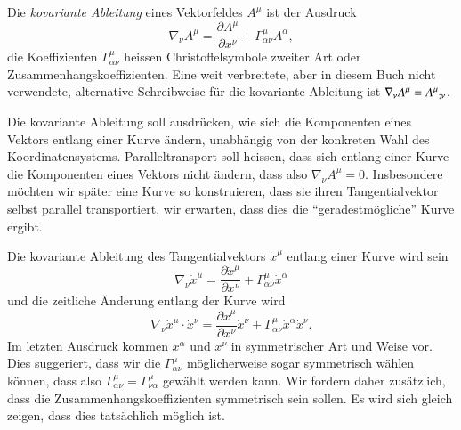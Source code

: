 \begin{definition}
Die {\em kovariante Ableitung} eines Vektorfeldes $A^\mu$ ist der 
%
%
Ausdruck
\begin{equation}
\nabla_\nu A^\mu
=
\frac{\partial A^\mu}{\partial x^\nu}
+
\Gamma^\mu_{\alpha\nu}A^\alpha,
\label{skript:geodaeten:kovarianteableitung}
\end{equation}
die Koeffizienten $\Gamma^\mu_{\alpha\nu}$ heissen Christoffelsymbole
zweiter Art oder Zusammenhangskoeffizienten.
Eine weit verbreitete, aber in diesem Buch nicht verwendete,
alternative Schreibweise für die kovariante Ableitung ist
$
\nabla_\nu A^\mu
=
A^\mu\mathstrut_{;\nu}
$.
\end{definition}

Die kovariante Ableitung soll ausdrücken, wie sich die Komponenten eines
Vektors entlang einer Kurve ändern, unabhängig von der konkreten Wahl
des Koordinatensystems.
Paralleltransport soll heissen, dass sich entlang einer Kurve die
Komponenten eines Vektors nicht ändern,
dass also $\nabla_\nu A^\mu=0$.
Insbesondere möchten wir später eine Kurve so konstruieren, dass
sie ihren Tangentialvektor selbst parallel transportiert,
wir erwarten, dass dies die ``geradestmögliche'' Kurve ergibt.

Die kovariante Ableitung des Tangentialvektors $\dot x^\mu$ entlang
einer Kurve wird sein
\[
\nabla_\nu\dot x^\mu
=
\frac{\partial \dot x^\mu}{\partial x^\nu}
+
\Gamma^\mu_{\alpha\nu}\dot x^\alpha
\]
und die zeitliche Änderung entlang der Kurve wird
\[
\nabla_\nu\dot x^\mu\cdot \dot x^\nu
=
\frac{\partial \dot x^\mu}{\partial x^\nu}\dot x^\nu
+
\Gamma^\mu_{\alpha\nu}\dot x^\alpha \dot x^\nu.
\]
Im letzten Ausdruck kommen $x^\alpha$ und $x^\nu$ in symmetrischer
Art und Weise vor.
Dies suggeriert, dass wir die $\Gamma^\mu_{\alpha\nu}$ möglicherweise
sogar symmetrisch wählen können, dass also
$\Gamma^\mu_{\alpha\nu}=\Gamma^\mu_{\nu\alpha}$
gewählt werden kann.
Wir fordern daher zusätzlich, dass die Zusammenhangskoeffizienten
symmetrisch sein sollen.
Es wird sich gleich zeigen, dass dies tatsächlich möglich ist.

